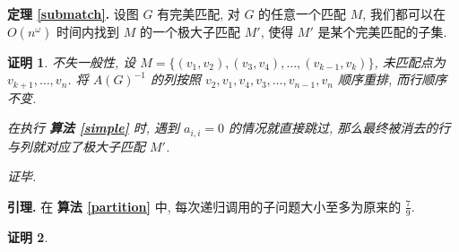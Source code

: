 \documentclass[a4paper]{article}
\newtheorem*{Proof}{\hspace{2em}证明}
\begin{document}
		{\bfseries 定理 \ref{submatch}.}
			设图 $G$ 有完美匹配, 对 $G$ 的任意一个匹配 $M$, 我们都可以在 $O(n^\omega)$ 时间内找到 $M$ 的一个极大子匹配 $M'$, 使得 $M'$ 是某个完美匹配的子集.

		\begin{Proof}
			不失一般性, 设 $M = \{(v_1, v_2), (v_3, v_4), \dots, (v_{k - 1}, v_k)\}$, 未匹配点为 $v_{k + 1}, \dots, v_n$. 将 $A(G)^{-1}$ 的列按照 $v_2, v_1, v_4, v_3, \dots, v_{n - 1}, v_n$ 顺序重排, 而行顺序不变.
			
			在执行 {\bfseries 算法 \ref{simple}} 时, 遇到 $a_{i, i} = 0$ 的情况就直接跳过, 那么最终被消去的行与列就对应了极大子匹配 $M'$.

			证毕.
		\end{Proof}

		{\bfseries 引理.}
			在 {\bfseries 算法 \ref{partition}} 中, 每次递归调用的子问题大小至多为原来的 $\frac 7 9$.

		\begin{Proof} 
		\end{Proof}
\end{document}
